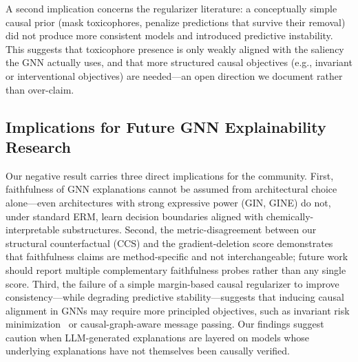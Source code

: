 \documentclass[conference]{IEEEtran}
\begin{document}
A second implication concerns the regularizer literature: a conceptually simple causal prior (mask toxicophores, penalize predictions that survive their removal) did not produce more consistent models and introduced predictive instability. This suggests that toxicophore presence is only weakly aligned with the saliency the GNN actually uses, and that more structured causal objectives (e.g., invariant or interventional objectives) are needed---an open direction we document rather than over-claim.

\subsection*{Implications for Future GNN Explainability Research}
Our negative result carries three direct implications for the community.
First, faithfulness of GNN explanations cannot be assumed from architectural
choice alone---even architectures with strong expressive power (GIN, GINE)
do not, under standard ERM, learn decision boundaries aligned with
chemically-interpretable substructures. Second, the metric-disagreement
between our structural counterfactual (CCS) and the gradient-deletion score
demonstrates that faithfulness claims are method-specific and
not interchangeable; future work should report multiple complementary
faithfulness probes rather than any single score. Third, the failure of a
simple margin-based causal regularizer to improve consistency---while
degrading predictive stability---suggests that inducing causal alignment
in GNNs may require more principled objectives, such as invariant risk
minimization~\cite{arjovsky2019invariant} or causal-graph-aware message
passing. Our findings suggest caution when LLM-generated explanations are
layered on models whose underlying explanations have not themselves been
causally verified.
\end{document}
